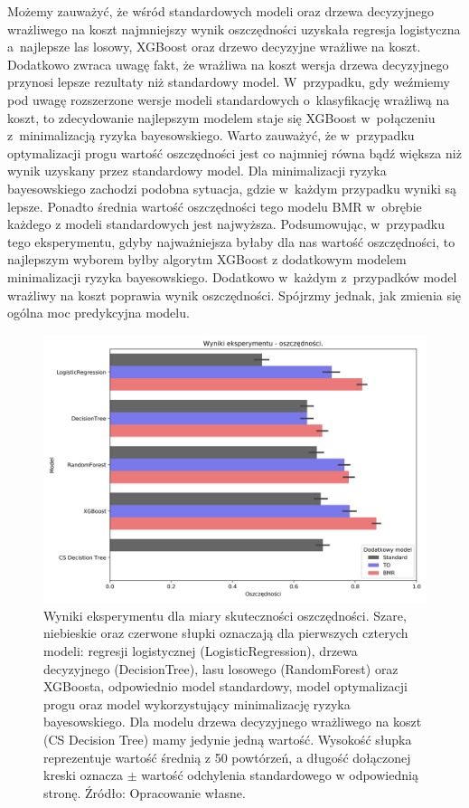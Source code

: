 \documentclass[inzynierska]{pwr_wmat_praca_dyplomowa}
\theoremstyle{plain}
\numberwithin{theorem}{chapter}
\theoremstyle{definition}
\numberwithin{theorem}{chapter}
\begin{document}
Możemy zauważyć, że wśród standardowych modeli oraz drzewa decyzyjnego wrażliwego na koszt najmniejszy wynik oszczędności uzyskała regresja logistyczna a~najlepsze las losowy, XGBoost oraz drzewo decyzyjne wrażliwe na koszt. Dodatkowo zwraca uwagę fakt, że wrażliwa na koszt wersja drzewa decyzyjnego przynosi lepsze rezultaty niż standardowy model. W~przypadku, gdy weźmiemy pod uwagę rozszerzone wersje modeli standardowych o~klasyfikację wrażliwą na koszt, to zdecydowanie najlepszym modelem staje się XGBoost w~połączeniu z~minimalizacją ryzyka bayesowskiego. Warto zauważyć, że w~przypadku optymalizacji progu wartość oszczędności jest co najmniej równa bądź większa niż wynik uzyskany przez standardowy model. Dla minimalizacji ryzyka bayesowskiego zachodzi podobna sytuacja, gdzie w~każdym przypadku wyniki są lepsze. Ponadto średnia wartość oszczędności tego modelu BMR w~obrębie każdego z modeli standardowych jest najwyższa. Podsumowując, w~przypadku tego eksperymentu, gdyby najważniejsza byłaby dla nas wartość oszczędności, to najlepszym wyborem byłby algorytm XGBoost z dodatkowym modelem minimalizacji ryzyka bayesowskiego. Dodatkowo w~każdym z~przypadków model wrażliwy na koszt poprawia wynik oszczędności. Spójrzmy jednak, jak zmienia się ogólna moc predykcyjna modelu.

\begin{figure}
	\includegraphics[width=\linewidth]{images/100_config1-Savings.png}
	\caption{Wyniki eksperymentu dla miary skuteczności oszczędności. Szare, niebieskie oraz czerwone słupki oznaczają dla pierwszych czterych modeli: regresji logistycznej (LogisticRegression), drzewa decyzyjnego (DecisionTree), lasu losowego (RandomForest) oraz XGBoosta, odpowiednio model standardowy, model optymalizacji progu oraz model wykorzystujący minimalizację ryzyka bayesowskiego. Dla modelu drzewa decyzyjnego wrażliwego na koszt (CS Decision Tree) mamy jedynie jedną wartość. Wysokość słupka reprezentuje wartość średnią z 50 powtórzeń, a długość dołączonej kreski oznacza $\pm$ wartość odchylenia standardowego w odpowiednią stronę. Źródło: Opracowanie własne.}
	\label{fig:results-savings}
\end{figure}
\end{document}
